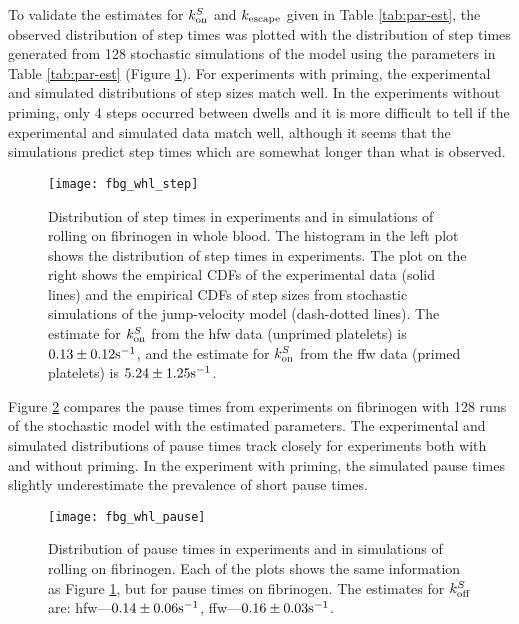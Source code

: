\documentclass{biophys-new}
\newcommand{\tn}{\textnormal}
\newcommand{\inv}{^{-1}}
\begin{document}
To validate the estimates for $k^S_\textnormal{on}$ and $k_\textnormal{escape}$ given in
Table \ref{tab:par-est}, the observed distribution of step times was
plotted with the distribution of step times generated from 128
stochastic simulations of the model using the parameters in Table
\ref{tab:par-est} (Figure \ref{fig:fbg-whl-step}). For experiments
with priming, the experimental and simulated distributions of step
sizes match well. In the experiments without priming, only 4 steps
occurred between dwells and it is more difficult to tell if the
experimental and simulated data match well, although it seems that the
simulations predict step times which are somewhat longer than what is
observed.

\begin{figure}
  \centering
  \texttt{[image: fbg\_whl\_step]}
  \caption[Step times on fibrinogen]{Distribution of step times in
    experiments and in simulations of rolling on fibrinogen in whole
    blood.  The histogram in the left plot shows the distribution of
    step times in experiments. The plot on the right shows the
    empirical CDFs of the experimental data (solid lines) and the
    empirical CDFs of step sizes from stochastic simulations of the
    jump-velocity model (dash-dotted lines). The estimate for
    $k^S_\textnormal{on}$ from the hfw data (unprimed platelets) is
    $0.13 \pm 0.12 \tn{s}\inv$, and the estimate for $k^S_\textnormal{on}$ from the ffw
    data (primed platelets) is $5.24 \pm 1.25 \tn{s}\inv$.}
  \label{fig:fbg-whl-step}
\end{figure}

Figure \ref{fig:fbg-whl-pause} compares the pause times from
experiments on fibrinogen with 128 runs of the stochastic model with
the estimated parameters. The experimental and simulated distributions
of pause times track closely for experiments both with and without
priming. In the experiment with priming, the simulated pause times
slightly underestimate the prevalence of short pause times.

\begin{figure}
  \centering
  \texttt{[image: fbg\_whl\_pause]}
  \caption[Pause times on fibrinogen]{Distribution of pause times in
    experiments and in simulations of rolling on fibrinogen. Each of
    the plots shows the same information as Figure \ref{fig:fbg-whl-step},
    but for pause times on fibrinogen. The estimates for $k^S_\textnormal{off}$
    are: hfw---$0.14 \pm 0.06 \tn{s}\inv$, ffw---$0.16 \pm 0.03 \tn{s}\inv$.}
  \label{fig:fbg-whl-pause}
\end{figure}
\end{document}
